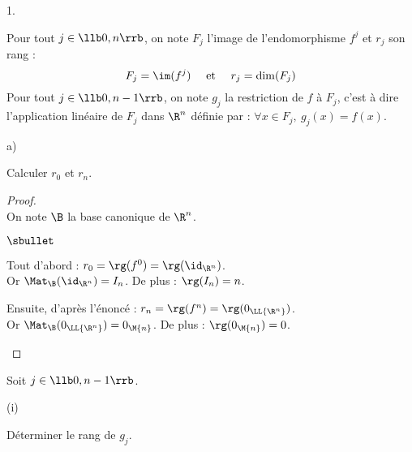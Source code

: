 \begin{noliste}{1.}
  
  \newpage
  
  
\item Pour tout $j \in \llb 0,n \rrb$, on note $F_j$ l'image de
  l'endomorphisme $f^j$ et $r_j$ son rang : 
  \[
  F_j = \im(f^j) \quad \text{ et } \quad r_j = \dim(F_j)
  \]
  Pour tout $j \in \llb 0, n-1 \rrb$, on note $g_j$ la restriction de
  $f$ à $F_j$, c'est à dire l'application linéaire de $F_j$ dans
  $\R^n$ définie par : $\forall x \in F_j, \ g_j(x)=f(x)$.
  \begin{noliste}{a)}
    \setlength{\itemsep}{2mm}
    \item Calculer $r_0$ et $r_n$.
    
    \begin{proof}~\\
    On note $\B$ la base canonique de $\R^n$.
    \begin{noliste}{$\sbullet$}
    \item Tout d'abord : $r_0 = \rg(f^0) = \rg(\id_{\R^n})$.\\[.1cm]
      Or $\Mat_\B(\id_{\R^n})=I_n$. De plus : $\rg(I_n)=n$. %
      
    \item Ensuite, d'après l'énoncé : $r_n = \rg(f^n) =
      \rg(0_{\LL{\R^n}})$.\\[.1cm]
      Or $\Mat_\B(0_{\LL{\R^n}}) = 0_{\M{n}}$. De plus :
      $\rg(0_{\M{n}}) = 0$.
      ~\\[-1.4cm]
    \end{noliste}
  \end{proof}

    
    \item Soit $j \in \llb 0,n-1\rrb$.
    \begin{nonoliste}{(i)}
      \item Déterminer le rang de $g_j$.
    \end{nonoliste}


\end{noliste}
\end{noliste}
